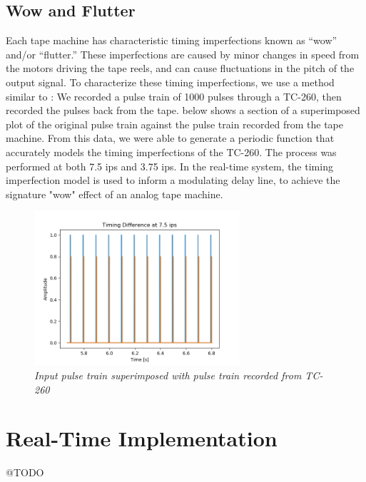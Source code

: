 \documentclass[twoside,a4paper]{article}
\begin{document}
\subsection{Wow and Flutter}
Each tape machine has characteristic timing imperfections
known as ``wow'' and/or ``flutter.'' These imperfections
are caused by minor changes in speed from the motors
driving the tape reels, and can cause fluctuations in
the pitch of the output signal. To characterize these
timing imperfections, we use a method similar to \cite{tapeDelay}:
We recorded a pulse train of 1000 pulses through a TC-260,
then recorded the pulses back from the tape. 
below shows a section of a superimposed plot of the original
pulse train against the pulse train recorded from the tape
machine. From this data, we were able to generate a periodic
function that accurately models the timing imperfections of
the TC-260. The process was performed at both 7.5 ips and 3.75
ips. In the real-time system, the timing imperfection model
is used to inform a modulating delay line, to achieve the
signature "wow" effect of an analog tape machine.

\begin{figure}[ht]
    \center
    \includegraphics[width=3in]{../Simulations/TimingEffects/timing_diff_7-5.png}
    \caption{\label{timingSim}{\it Input pulse train superimposed with pulse train recorded from TC-260}}
\end{figure}
%

\section{Real-Time Implementation}
@TODO
\end{document}
